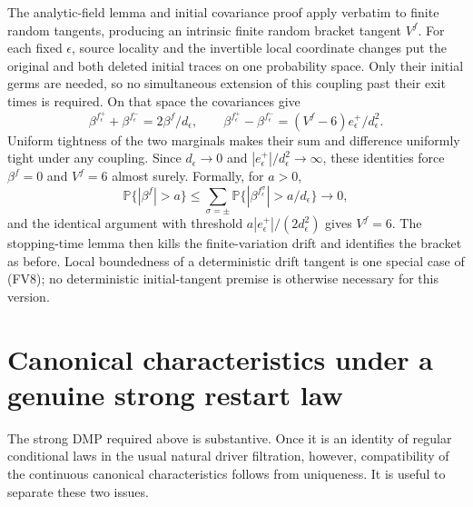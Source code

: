 \documentclass[11pt]{article}
\theoremstyle{definition}\newtheorem{definition}[theorem]{Definition}
\theoremstyle{remark}\newtheorem{remark}[theorem]{Remark}
\begin{document}
The analytic-field lemma and initial covariance proof apply verbatim to
finite random tangents, producing an intrinsic finite random bracket
tangent $V^f$. For each fixed $\epsilon$, source locality and the
invertible local coordinate changes put the original and both deleted
initial traces on one probability space. Only their initial germs are
needed, so no simultaneous extension of this coupling past their exit times
is required. On that space the covariances give
\[
 \beta^{f_\epsilon^+}+\beta^{f_\epsilon^-}
       =2\beta^f/d_\epsilon,
 \qquad
 \beta^{f_\epsilon^+}-\beta^{f_\epsilon^-}
       =(V^f-6)e_\epsilon^+/d_\epsilon^2.
\]
Uniform tightness of the two marginals makes their sum and difference
uniformly tight under any coupling. Since $d_\epsilon\to0$ and
$|e_\epsilon^+|/d_\epsilon^2\to\infty$, these identities force
$\beta^f=0$ and $V^f=6$ almost surely. Formally, for $a>0$,
\[
 \mathbb P\{|\beta^f|>a\}
 \le \sum_{\sigma=\pm}
       \mathbb P\{|\beta^{f_\epsilon^\sigma}|>a/d_\epsilon\}
       \longrightarrow0,
\]
and the identical argument with threshold
$a|e_\epsilon^+|/(2d_\epsilon^2)$ gives $V^f=6$.
The stopping-time lemma then kills the finite-variation drift and identifies
the bracket as before. Local boundedness of a deterministic drift tangent
is one special case of (FV8); no deterministic initial-tangent premise is
otherwise necessary for this version.



\section{Canonical characteristics under a genuine strong restart law}
\label{sec:canonical-restart-automatic}

The strong DMP required above is substantive. Once it is an identity of
regular conditional laws in the usual natural driver filtration, however,
compatibility of the continuous canonical characteristics follows from
uniqueness. It is useful to separate these two issues.
\end{document}
